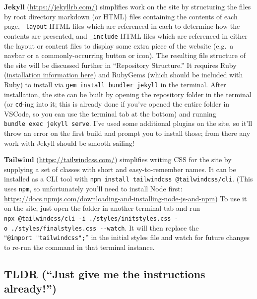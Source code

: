 \documentclass[
]{book}
\begin{document}
\textbf{Jekyll} (\url{https://jekyllrb.com/}) simplifies work on the site by structuring the files by root directory markdown (or HTML) files containing the contents of each page, \texttt{\_layout} HTML files which are referenced in each to determine how the contents are presented, and \texttt{\_include} HTML files which are referenced in either the layout or content files to display some extra piece of the website (e.g.~a navbar or a commonly-occurring button or icon). The resulting file structure of the site will be discussed further in ``Repository Structure.'' It requires Ruby (\href{https://www.ruby-lang.org/en/documentation/installation/}{installation information here}) and RubyGems (which should be included with Ruby) to install via \texttt{gem\ install\ bundler\ jekyll} in the terminal. After installation, the site can be built by opening the repository folder in the terminal (or \texttt{cd}-ing into it; this is already done if you've opened the entire folder in VSCode, so you can use the terminal tab at the bottom) and running \texttt{bundle\ exec\ jekyll\ serve}. I've used some additional plugins on the site, so it'll throw an error on the first build and prompt you to install those; from there any work with Jekyll should be smooth sailing!

\textbf{Tailwind} (\url{https://tailwindcss.com/}) simplifies writing CSS for the site by supplying a set of classes with short and easy-to-remember names. It can be installed as a CLI tool with \texttt{npm\ install\ tailwindcss\ @tailwindcss/cli}. (This uses \texttt{npm}, so unfortunately you'll need to install Node first: \url{https://docs.npmjs.com/downloading-and-installing-node-js-and-npm}) To use it on the site, just open the folder in another terminal tab and run \texttt{npx\ @tailwindcss/cli\ -i\ ./styles/initstyles.css\ -o\ ./styles/finalstyles.css\ -\/-watch}. It will then replace the ``\texttt{@import\ "tailwindcss";}'' in the initial styles file and watch for future changes to re-run the command in that terminal instance.

\subsection{TLDR (``Just give me the instructions already!'')}\label{tldr-just-give-me-the-instructions-already}
\end{document}
